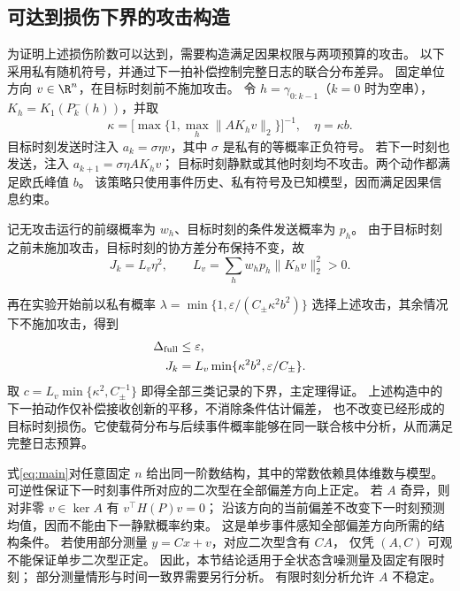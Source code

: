 \subsection{可达到损伤下界的攻击构造}
为证明上述损伤阶数可以达到，需要构造满足因果权限与两项预算的攻击。
以下采用私有随机符号，并通过下一拍补偿控制完整日志的联合分布差异。
固定单位方向 $v\in\R^n$，在目标时刻前不施加攻击。
令 $h=\gamma_{0:k-1}$（$k=0$ 时为空串），$K_h=K_1(P_k^-(h))$，并取
\begin{equation}
 \kappa=\bigl[\max\{1,\max_h\|AK_hv\|_2\}\bigr]^{-1},\quad \eta=\kappa b.
 \label{eq:kappa}
\end{equation}
目标时刻发送时注入 $a_k=\sigma\eta v$，其中 $\sigma$ 是私有的等概率正负符号。
若下一时刻也发送，注入 $a_{k+1}=\sigma\eta AK_hv$；
目标时刻静默或其他时刻均不攻击。两个动作都满足欧氏峰值 $b$。
该策略只使用事件历史、私有符号及已知模型，因而满足因果信息约束。

记无攻击运行的前缀概率为 $w_h$、目标时刻的条件发送概率为 $p_h$。
由于目标时刻之前未施加攻击，目标时刻的协方差分布保持不变，故
\begin{equation}
 J_k=L_v\eta^2,\qquad L_v=\sum_hw_hp_h\|K_hv\|_2^2>0.
 \label{eq:lower-damage}
\end{equation}

再在实验开始前以私有概率
$\lambda=\min\{1,\varepsilon/(C_\pm\kappa^2b^2)\}$ 选择上述攻击，其余情况下不施加攻击，得到
\begin{equation}
 \begin{aligned}
 \Delta_{\rm full}&\le\varepsilon,\\
 J_k&=L_v\min\{\kappa^2b^2,\varepsilon/C_\pm\}.
 \end{aligned}
 \label{eq:attainable}
\end{equation}
取 $c=L_v\min\{\kappa^2,C_\pm^{-1}\}$ 即得全部三类记录的下界，主定理得证。
上述构造中的下一拍动作仅补偿接收创新的平移，不消除条件估计偏差，
也不改变已经形成的目标时刻损伤。它使载荷分布与后续事件概率能够在同一联合核中分析，从而满足完整日志预算。

\begin{remark}[维数、观测条件和时间范围]
式\eqref{eq:main}对任意固定 $n$ 给出同一阶数结构，其中的常数依赖具体维数与模型。
可逆性保证下一时刻事件所对应的二次型在全部偏差方向上正定。
若 $A$ 奇异，则对非零 $v\in\ker A$ 有 $v^\top H(P)v=0$；
沿该方向的当前偏差不改变下一时刻预测均值，因而不能由下一静默概率约束。
这是单步事件感知全部偏差方向所需的结构条件。
若使用部分测量 $y=Cx+v$，对应二次型含有 $CA$，
仅凭 $(A,C)$ 可观不能保证单步二次型正定。
因此，本节结论适用于全状态含噪测量及固定有限时刻；
部分测量情形与时间一致界需要另行分析。
有限时刻分析允许 $A$ 不稳定。
\end{remark}
